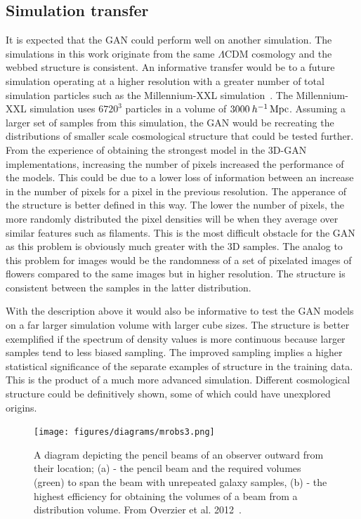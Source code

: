 \documentclass[twocolumn]{article}
\numberwithin{equation}{section}
\begin{document}
\subsection{Simulation transfer}
It is expected that the GAN could perform well on another simulation. The simulations in this work originate from the same $\Lambda \text{CDM}$ cosmology and the webbed structure is consistent. An informative transfer would be to a future simulation operating at a higher resolution with a greater number of total simulation particles such as the Millennium-XXL simulation~\cite{millxxlsim}. The Millennium-XXL simulation uses $6720^3$ particles in a volume of $3000 \: h^{-1} \,\textup{Mpc}$. Assuming a larger set of samples from this simulation, the GAN would be recreating the distributions of smaller scale cosmological structure that could be tested further. From the experience of obtaining the strongest model in the 3D-GAN implementations, increasing the number of pixels increased the performance of the models. This could be due to a lower loss of information between an increase in the number of pixels for a pixel in the previous resolution. The apperance of the structure is better defined in this way. The lower the number of pixels, the more randomly distributed the pixel densities will be when they average over similar features such as filaments. This is the most difficult obstacle for the GAN as this problem is obviously much greater with the 3D samples. The analog to this problem for images would be the randomness of a set of pixelated images of flowers compared to the same images but in higher resolution. The structure is consistent between the samples in the latter distribution. 

With the description above it would also be informative to test the GAN models on a far larger simulation volume with larger cube sizes. The structure is better exemplified if the spectrum of density values is more continuous because larger samples tend to less biased sampling. The improved sampling implies a higher statistical significance of the separate examples of structure in the training data. This is the product of a much more advanced simulation. Different cosmological structure could be definitively shown, some of which could have unexplored origins. 

\begin{figure}[hbt!]
\texttt{[image: figures/diagrams/mrobs3.png]}
\centering
\caption{A diagram depicting the pencil beams of an observer outward from their location; (a) - the pencil beam and the required volumes (green) to span the beam with unrepeated galaxy samples, (b) - the highest efficiency for obtaining the volumes of a beam from a distribution volume. From Overzier et al. 2012~\cite{MRObs}.}
\label{fig:MRObs}
\end{figure}
\end{document}
